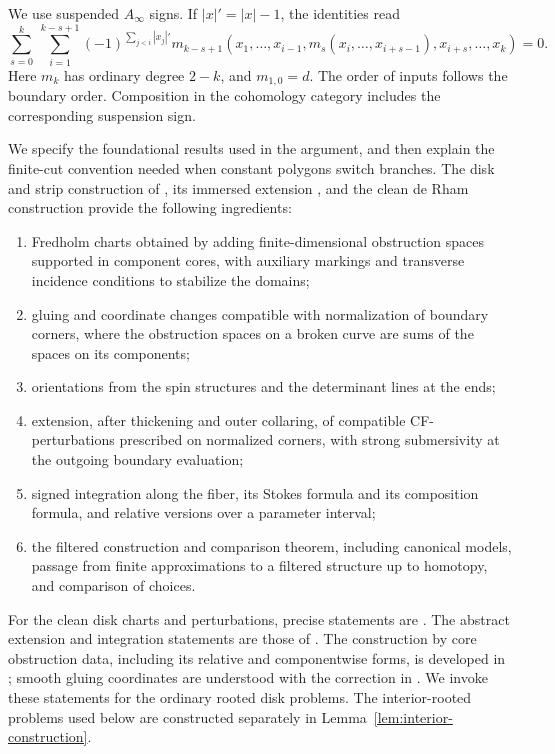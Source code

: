 \documentclass[11pt]{article}
\numberwithin{equation}{section}
\theoremstyle{definition}
\theoremstyle{remark}
\begin{document}
We use suspended $A_\infty$ signs.  If $|x|'=|x|-1$, the identities read
\begin{equation}
 \label{eq:floer-ainfinity}
 \sum_{s=0}^k\ \sum_{i=1}^{k-s+1}
 (-1)^{\sum_{j<i}|x_j|'}
 m_{k-s+1}(x_1,\ldots,x_{i-1},m_s(x_i,\ldots,x_{i+s-1}),
 x_{i+s},\ldots,x_k)=0.
\end{equation}
Here $m_k$ has ordinary degree $2-k$, and $m_{1,0}=d$.
The order of inputs follows the boundary order.  Composition in the
cohomology category includes the corresponding suspension sign.

We specify the foundational results used in the argument, and then
explain the finite-cut convention needed when constant polygons switch
branches.  The disk and strip construction of
\cite[Chapters~7--8]{Floer:FOOO}, its immersed extension
\cite[Sections~4--12]{Floer:AJ}, and the clean de Rham construction
\cite[Section~3]{Floer:Fukaya} provide the following ingredients:
\begin{enumerate}[label=(\roman*)]
 \item Fredholm charts obtained by adding finite-dimensional obstruction
 spaces supported in component cores, with auxiliary markings and
 transverse incidence conditions to stabilize the domains;
 \item gluing and coordinate changes compatible with normalization of
 boundary corners, where the obstruction spaces on a broken curve are
 sums of the spaces on its components;
 \item orientations from the spin structures and the determinant lines
 at the ends;
 \item extension, after thickening and outer collaring, of compatible
 CF-perturbations prescribed on normalized corners, with strong
 submersivity at the outgoing boundary evaluation;
 \item signed integration along the fiber, its Stokes formula and its
 composition formula, and relative versions over a parameter interval;
 \item the filtered construction and comparison theorem, including
 canonical models, passage from finite approximations to a filtered
 structure up to homotopy, and comparison of choices.
\end{enumerate}
For the clean disk charts and perturbations, precise statements are
\cite[Theorem~3.24 and Propositions~3.29--3.30]{Floer:Fukaya}.
The abstract extension and integration statements are those of
\cite[Chapters~9--10, 15, 17, and~21]{Floer:Kuranishi}.
The construction by core obstruction data, including its relative
and componentwise forms, is developed in
\cite{Floer:DisksI,Floer:DisksII}; smooth gluing coordinates are understood
with the correction in \cite{Floer:Corrigendum}.
We invoke these statements for the ordinary rooted disk problems.
The interior-rooted problems used below are constructed separately in
Lemma~\ref{lem:interior-construction}.
\end{document}
